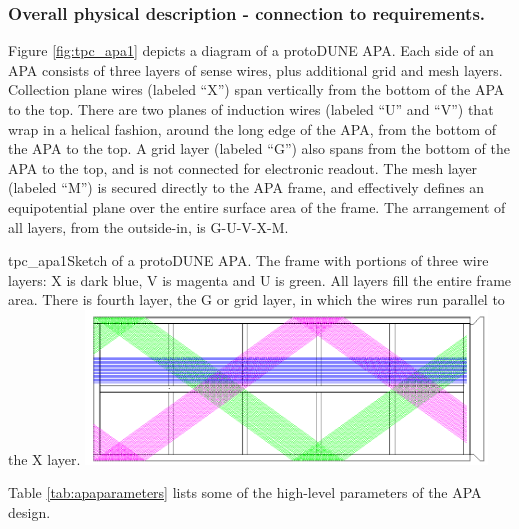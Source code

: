 \subsubsection{Overall physical description - connection to requirements.}

Figure \ref{fig:tpc_apa1} depicts a diagram of a protoDUNE APA.  Each side of an APA consists of three layers of sense wires, plus additional grid and mesh layers.  Collection plane wires (labeled ``X'') span vertically from the bottom of the APA to the top.  There are two planes of induction wires (labeled ``U'' and ``V'') that wrap in a helical fashion, around the long edge of the APA, from the bottom of the APA to the top.  A grid layer (labeled ``G'') also spans from the bottom of the APA to the top, and is not connected for electronic readout.  The mesh layer (labeled ``M'') is secured directly to the APA frame, and effectively defines an equipotential plane over the entire surface area of the frame.  The arrangement of all layers, from the outside-in, is G-U-V-X-M. 

\begin{cdrfigure}{tpc_apa1}{Sketch of a protoDUNE APA. The frame with portions of three wire layers: X is dark blue, V is magenta and U is green.  All layers fill the entire frame area.  There is fourth layer, the G or grid layer, in which the wires run parallel to the X layer.}
\includegraphics[width=0.8\textwidth, angle=90]{figures/tpc_apa1.png} 
\end{cdrfigure}

Table \ref{tab:apaparameters} lists some of the high-level parameters of the APA design.

